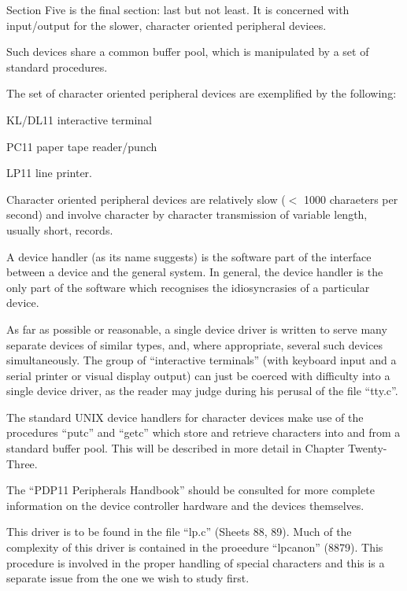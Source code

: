 %
%
{\sf Section Five is the final section: last
but not least. It is concerned with
input/output for the slower, character
oriented peripheral deviees.

Such devices share a common buffer
pool, which is manipulated by a set of
standard procedures.

The set of character oriented peripheral devices are exemplified by the
following:

\bi
\item KL/DL11 interactive terminal
\item PC11 paper tape reader/punch
\item LP11 line printer.
\ei
}


Character oriented peripheral devices
are relatively slow ($<$ 1000 charaeters
per second) and involve character by
character transmission of variable
length, usually short, records.

A device handler (as its name suggests)
is the software part of the interface
between a device and the general system. In general, the device handler is
the only part of the software which
recognises the idiosyncrasies of a particular device.

As far as possible or reasonable, a
single device driver is written to
serve many separate devices of similar
types, and, where appropriate, several
such devices simultaneously. The group
of ``interactive terminals'' (with keyboard input and a serial printer or
visual display output) can just be
coerced with difficulty into a single
device driver, as the reader may judge
during his perusal of the file ``tty.c''.

The standard UNIX device handlers for
character devices make use of the procedures ``putc'' and ``getc'' which store
and retrieve characters into and from a
standard buffer pool. This will be
described in more detail in Chapter
Twenty-Three.

The ``PDP11 Peripherals Handbook'' should
be consulted for more complete information on the device controller hardware
and the devices themselves.


This driver is to be found in the file
``lp.c'' (Sheets 88, 89). Much of the
complexity of this driver is contained
in the proeedure ``lpcanon'' (8879).
This procedure is involved in the
proper handling of special characters
and this is a separate issue from the
one we wish to study first.

